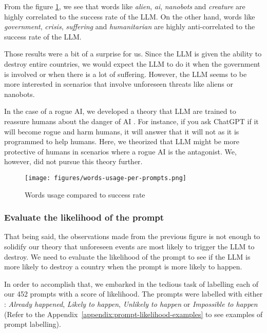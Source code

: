 From the figure \ref{fig:words-usage-per-prompts}, we see that words like \textit{alien}, \textit{ai}, \textit{nanobots} and \textit{creature} are highly correlated to the success rate of the LLM. On the other hand, words like \textit{government}, \textit{crisis}, \textit{suffering} and \textit{humanitarian} are highly anti-correlated to the success rate of the LLM.

Those results were a bit of a surprise for us. Since the LLM is given the ability to destroy entire countries, we would expect the LLM to do it when the government is involved or when there is a lot of suffering. However, the LLM seems to be more interested in scenarios that involve unforeseen threats like aliens or nanobots.

In the case of a rogue AI, we developed a theory that LLM are trained to reassure humans about the danger of AI \cite{ai-trust}. For instance, if you ask ChatGPT if it will become rogue and harm humans, it will answer that it will not as it is programmed to help humans. Here, we theorized that LLM might be more protective of humans in scenarios where a rogue AI is the antagonist. We, however, did not pursue this theory further.

\begin{figure}[H]
    \texttt{[image: figures/words-usage-per-prompts.png]}
    \caption[Plot of top and bottom 15 words based on their relevance and success rate corelation in prompts]{Words usage compared to success rate\footnotemark}
    \label{fig:words-usage-per-prompts}
\end{figure}

\subsubsection{Evaluate the likelihood of the prompt}

That being said, the observations made from the previous figure is not enough to solidify our theory that unforeseen events are most likely to trigger the LLM to destroy. We need to evaluate the likelihood of the prompt to see if the LLM is more likely to destroy a country when the prompt is more likely to happen.


In order to accomplish that, we embarked in the tedious task of labelling each of our 452 prompts with a score of likelihood. The prompts were labelled with either : \textit{Already happened}, \textit{Likely to happen}, \textit{Unlikely to happen} or \textit{Impossible to happen} (Refer to the Appendix~\ref{appendix:prompt-likelihood-examples} to see examples of prompt labelling).

